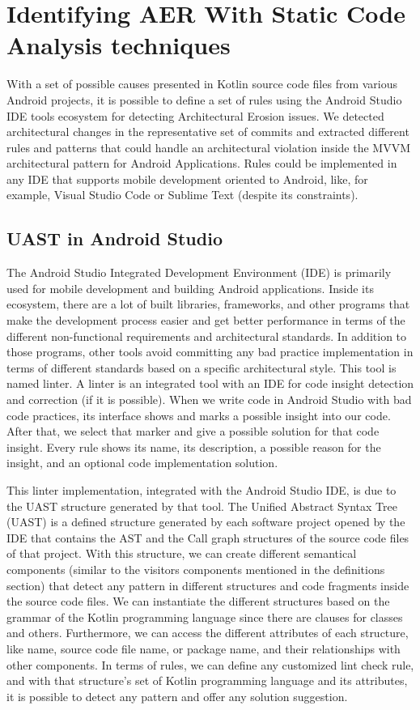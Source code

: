\chapter{Identifying AER With Static Code Analysis techniques}
\label{cha:detection}

With a set of possible causes presented in Kotlin source code files from various Android projects, it is possible to define a set of rules using the Android Studio IDE tools ecosystem for detecting Architectural Erosion issues. We detected architectural changes in the representative set of commits and extracted different rules and patterns that could handle an architectural violation inside the MVVM architectural pattern for Android Applications. Rules could be implemented in any IDE that supports mobile development oriented to Android, like, for example, Visual Studio Code or Sublime Text (despite its constraints).


\section{UAST in Android Studio}
The Android Studio Integrated Development Environment (IDE) is primarily used for mobile development and building Android applications. Inside its ecosystem, there are a lot of built libraries, frameworks, and other programs that make the development process easier and get better performance in terms of the different non-functional requirements and architectural standards. In addition to those programs, other tools avoid committing any bad practice implementation in terms of different standards based on a specific architectural style. This tool is named linter. A linter is an integrated tool with an IDE for code insight detection and correction  (if it is possible). When we write code in Android Studio with bad code practices, its interface shows and marks a possible insight into our code. After that, we select that marker and give a possible solution for that code insight. Every rule shows its name, its description, a possible reason for the insight, and an optional code implementation solution.

This linter implementation, integrated with the Android Studio IDE, is due to the UAST structure generated by that tool. The Unified Abstract Syntax Tree (UAST) is a defined structure generated by each software project opened by the IDE that contains the AST and the Call graph structures of the source code files of that project. With this structure, we can create different semantical components (similar to the visitors components mentioned in the definitions section) that detect any pattern in different structures and code fragments inside the source code files. We can instantiate the different structures based on the grammar of the Kotlin programming language since there are clauses for classes and others. Furthermore, we can access the different attributes of each structure, like name, source code file name, or package name, and their relationships with other components. In terms of rules, we can define any customized lint check rule, and with that structure's set of Kotlin programming language and its attributes, it is possible to detect any pattern and offer any solution suggestion.

